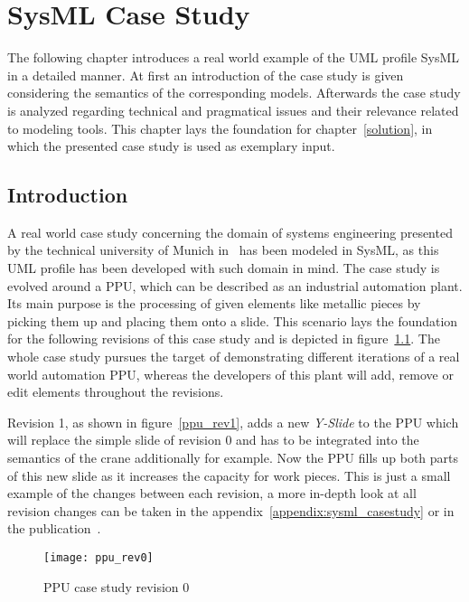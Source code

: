 \chapter{SysML Case Study}\label{sysml}
The following chapter introduces a real world example of the \ac{UML} profile
\ac{SysML} in a detailed manner. At first an
introduction of the case study is given considering the semantics of the corresponding models.
Afterwards the case study is analyzed regarding technical and pragmatical issues
and their relevance related to modeling tools. This chapter lays the foundation
for chapter~\ref{solution}, in which the presented case study is used as exemplary input.
\section{Introduction}\label{sysml:introduction}
A real world case study concerning the domain of systems engineering presented by
the technical university of Munich in~\cite{aiscasestudy} has been modeled in
\ac{SysML}, as this \ac{UML} profile has been developed with such domain in
mind. The case study is evolved around a \ac{PPU}, which can be described as an
industrial automation plant. Its main purpose is the processing of given
elements like metallic pieces by picking them up and placing them onto a slide.
This scenario lays the foundation for the following revisions of this case
study and is depicted in figure~\ref{ppu_rev0}. The whole case study pursues
the target of demonstrating different iterations of a real world automation
\ac{PPU}, whereas the developers of this plant will add, remove or edit
elements throughout the revisions.

Revision 1, as shown in figure~\ref{ppu_rev1}, adds a new \textit{Y-Slide} to
the \ac{PPU} which will replace the simple slide of revision 0 and has to be
integrated into the semantics of the crane additionally for example. Now the
\ac{PPU} fills up both parts of this new slide as it increases the capacity for
work pieces. This is just a small example of the changes between each revision, a
more in-depth look at all revision changes can be taken in
the appendix~\ref{appendix:sysml_casestudy} or in the
publication~\cite{aiscasestudy}.

\begin{figure}[h!]
\begin{center}
\texttt{[image: ppu\_rev0]}\\
\end{center}
\caption{\ac{PPU} case study revision 0~\cite{aiscasestudy}}
\label{ppu_rev0}
\end{figure}

